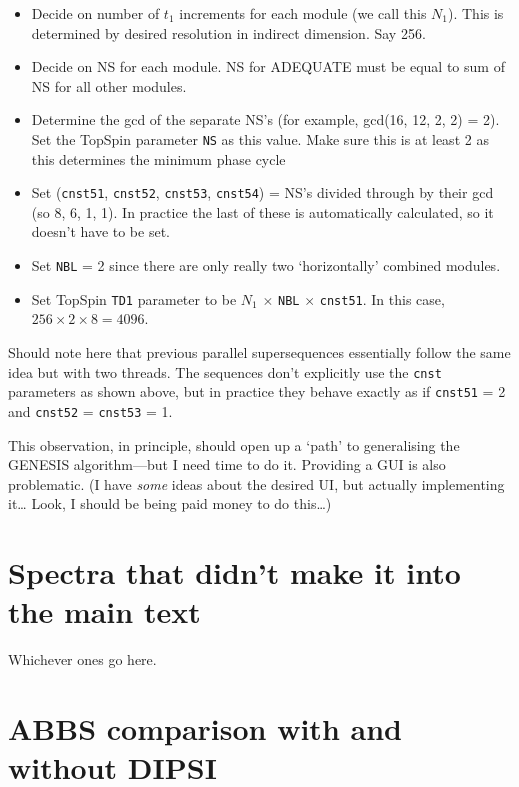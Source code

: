 \documentclass[a4paper,12pt]{article}
\newcommand{\todo}[1]{{\color{OrangeRed}#1}}
\begin{document}
\begin{refsection}
\begin{itemize}
    \item Decide on number of $t_1$ increments for each module (we call this $N_1$). This is determined by desired resolution in indirect dimension. Say 256.
    \item Decide on NS for each module. NS for ADEQUATE must be equal to sum of NS for all other modules.
    \item Determine the gcd of the separate NS's (for example, gcd(16, 12, 2, 2) = 2). Set the TopSpin parameter \texttt{NS} as this value. Make sure this is at least 2 as this determines the minimum phase cycle
    \item Set (\texttt{cnst51}, \texttt{cnst52}, \texttt{cnst53}, \texttt{cnst54}) = NS's divided through by their gcd (so 8, 6, 1, 1). In practice the last of these is automatically calculated, so it doesn't have to be set.
    \item Set \texttt{NBL} = 2 since there are only really two `horizontally' combined modules.
    \item Set TopSpin \texttt{TD1} parameter to be $N_1$ $\times$ \texttt{NBL} $\times$ \texttt{cnst51}. In this case, $256 \times 2 \times 8 = 4096$.
\end{itemize}

\todo{
    Should note here that previous parallel supersequences\autocite{Kupce2021JACSA} essentially follow the same idea but with two threads.
    The sequences don't explicitly use the \texttt{cnst} parameters as shown above, but in practice they behave exactly as if \texttt{cnst51} = 2 and \texttt{cnst52} = \texttt{cnst53} = 1.

    This observation, in principle, should open up a `path' to generalising the GENESIS algorithm---but I need time to do it.
    Providing a GUI is also problematic.
    (I have \textit{some} ideas about the desired UI, but actually implementing it\ldots{} Look, I should be being paid money to do this\ldots)
}


\section{Spectra that didn't make it into the main text}

Whichever ones go here.

\clearpage

\section{ABBS comparison with and without DIPSI}


\end{refsection}
\end{document}
